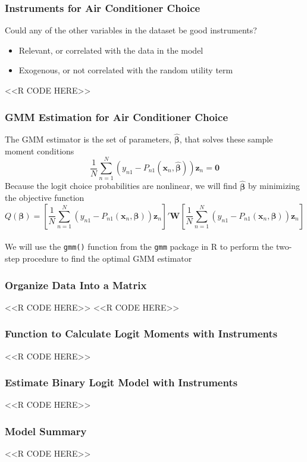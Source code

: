 \documentclass{beamer}
\begin{document}
\begin{frame}[fragile]\frametitle{Instruments for Air Conditioner Choice}
    Could any of the other variables in the dataset be good instruments?
    \begin{itemize}
    	\item Relevant, or correlated with the data in the model
    	\item Exogenous, or not correlated with the random utility term
    \end{itemize}
    <<R CODE HERE>>
\end{frame}

\begin{frame}\frametitle{GMM Estimation for Air Conditioner Choice}
    The GMM estimator is the set of parameters, $\widehat{\bm{\beta}}$, that solves these sample moment conditions
    $$\frac{1}{N} \sum_{n = 1}^N \left( y_{n1} - P_{n1}(\bm{x}_n, \widehat{\bm{\beta}}) \right) \bm{z}_n = \bm{0}$$
    Because the logit choice probabilities are nonlinear, we will find $\widehat{\bm{\beta}}$ by minimizing the objective function 
    $$Q(\bm{\beta}) = \left[ \frac{1}{N} \sum_{n = 1}^N \left( y_{n1} - P_{n1}(\bm{x}_n, \bm{\beta}) \right) \bm{z}_n \right]' \bm{W} \left[ \frac{1}{N} \sum_{n = 1}^N \left( y_{n1} - P_{n1}(\bm{x}_n, \bm{\beta}) \right) \bm{z}_n \right]$$ \\
    \vspace{3ex}
    We will use the \texttt{gmm()} function from the \texttt{gmm} package in R to perform the two-step procedure to find the optimal GMM estimator
\end{frame}

\begin{frame}[fragile]\frametitle{Organize Data Into a Matrix}
    <<R CODE HERE>>
    \vspace{2ex}
    <<R CODE HERE>>
\end{frame}

\begin{frame}[fragile]\frametitle{Function to Calculate Logit Moments with Instruments}
    <<R CODE HERE>>
\end{frame}

\begin{frame}[fragile]\frametitle{Estimate Binary Logit Model with Instruments}
    <<R CODE HERE>>
\end{frame}

\begin{frame}[fragile]\frametitle{Model Summary}
    <<R CODE HERE>>
\end{frame}
\end{document}
